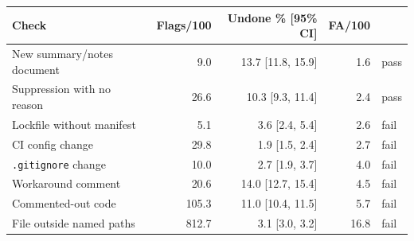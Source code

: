 \begin{tabular}{lrrrl}\toprule
Check & Flags/100 & Undone \% [95\% CI] & FA/100 & \\\midrule
New summary/notes document & 9.0 & 13.7 [11.8, 15.9] & 1.6 & pass \\
Suppression with no reason & 26.6 & 10.3 [9.3, 11.4] & 2.4 & pass \\
Lockfile without manifest & 5.1 & 3.6 [2.4, 5.4] & 2.6 & fail \\
CI config change & 29.8 & 1.9 [1.5, 2.4] & 2.7 & fail \\
\texttt{.gitignore} change & 10.0 & 2.7 [1.9, 3.7] & 4.0 & fail \\
Workaround comment & 20.6 & 14.0 [12.7, 15.4] & 4.5 & fail \\
Commented-out code & 105.3 & 11.0 [10.4, 11.5] & 5.7 & fail \\
File outside named paths & 812.7 & 3.1 [3.0, 3.2] & 16.8 & fail \\
\bottomrule\end{tabular}
